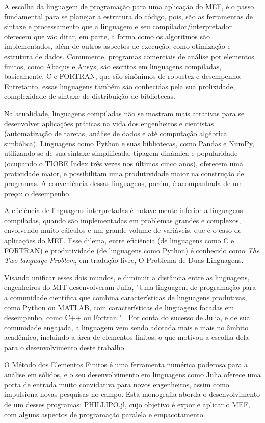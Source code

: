 A escolha da linguagem de programação para uma aplicação do MEF, é o passo fundamental para se planejar a estrutura do código, pois, são as ferramentas de sintaxe e processamento que a linguagem e seu compilador/interpretador oferecem que vão ditar, em parte, a forma como os algoritmos são implementados, além de outros aspectos de execução, como otimização e estrutura de dados. Comumente, programas comerciais de análise por elementos finitos, como Abaqus e Ansys, são escritos em linguagens compiladas, basicamente, C e FORTRAN, que são sinônimos de robustez e desempenho. Entretanto, essas linguagens também são conhecidas pela sua prolixidade, complexidade de sintaxe de distribuição de bibliotecas.

Na atualidade, linguagens compiladas não se mostram mais atrativas para se desenvolver aplicações práticas na vida dos engenheiros e cientistas (automatização de tarefas, análise de dados e até computação algébrica simbólica). Linguagens como Python e suas bibliotecas, como Pandas e NumPy, utilizando-se de sua sintaxe simplificada, tipagem dinâmica e popularidade (ocupando o TIOBE Index três vezes nos últimos cinco anos), oferecem uma praticidade maior, e possibilitam uma produtividade maior na construção de programas. A conveniência dessas linguagens, porém, é acompanhada de um preço: o desempenho.

A eficiência de linguagens interpretadas é notavelmente inferior a linguagens compiladas, quando são implementadas em problemas grandes e complexos, envolvendo muito cálculos e um grande volume de variáveis, que é o caso de aplicações do MEF. Esse dilema, entre eficiência (de linguagens como C e FORTRAN) e produtividade (de linguagens como Python) é conhecido como \emph{The Two language Problem}, em tradução livre, O Problema de Duas Linguagens.

Visando unificar esses dois mundos, e diminuir a distância entre as linguagens, engenheiros do MIT desenvolveram Julia, "Uma linguagem de programação para a comunidade científica que combina características de linguagens produtivas, como Python ou MATLAB, com características de linguagens focadas em desempenho, como C++ ou Fortran." \cite[tradução livre]{Bezanson}. Por conta do sucesso de Julia, e de sua comunidade engajada, a linguagem vem sendo adotada mais e mais no âmbito acadêmico, incluindo a área de elementos finitos, o que motivou a escolha dela para o desenvolvimento deste trabalho.

O Método dos Elementos Finitos é uma ferramenta numérica poderosa para a análise em sólidos, e o seu desenvolvimento em linguagens como Julia oferece uma porta de entrada muito convidativa para novos engenheiros, assim como impulsiona novas pesquisas no campo. Esta monografia aborda o desenvolvimento de um desses programas: PHILLIPO.jl, cujo objetivo é expor e aplicar o MEF, com alguns aspectos de programação paralela e empacotamento.


